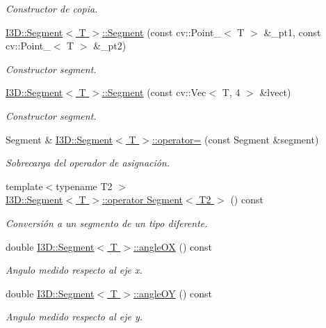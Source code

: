 \begin{DoxyCompactItemize}
\begin{DoxyCompactList}\small\item\em Constructor de copia. \end{DoxyCompactList}\item 
\hyperlink{group___geometric_entities_ga76e944eff092cf055965199957820f5b}{I3\+D\+::\+Segment$<$ T $>$\+::\+Segment} (const cv\+::\+Point\+\_\+$<$ T $>$ \&\+\_\+pt1, const cv\+::\+Point\+\_\+$<$ T $>$ \&\+\_\+pt2)
\begin{DoxyCompactList}\small\item\em Constructor segment. \end{DoxyCompactList}\item 
\hyperlink{group___geometric_entities_ga01623dcfd1be4e9472390b59e0ca3a58}{I3\+D\+::\+Segment$<$ T $>$\+::\+Segment} (const cv\+::\+Vec$<$ T, 4 $>$ \&lvect)
\begin{DoxyCompactList}\small\item\em Constructor segment. \end{DoxyCompactList}\item 
Segment \& \hyperlink{group___geometric_entities_gad1b2c0a4c4e1ea3c43ee24630eb26f1b}{I3\+D\+::\+Segment$<$ T $>$\+::operator=} (const Segment \&segment)
\begin{DoxyCompactList}\small\item\em Sobrecarga del operador de asignación. \end{DoxyCompactList}\item 
{\footnotesize template$<$typename T2 $>$ }\\\hyperlink{group___geometric_entities_ga363ef30b40d13ee361b9f0e32f135655}{I3\+D\+::\+Segment$<$ T $>$\+::operator Segment$<$ T2 $>$} () const 
\begin{DoxyCompactList}\small\item\em Conversión a un segmento de un tipo diferente. \end{DoxyCompactList}\item 
double \hyperlink{group___geometric_entities_ga911ebe69ce3cc5e6a486ef573d515866}{I3\+D\+::\+Segment$<$ T $>$\+::angle\+OX} () const 
\begin{DoxyCompactList}\small\item\em Angulo medido respecto al eje x. \end{DoxyCompactList}\item 
double \hyperlink{group___geometric_entities_ga324da1babfedb681fd7068fdc58d763b}{I3\+D\+::\+Segment$<$ T $>$\+::angle\+OY} () const 
\begin{DoxyCompactList}\small\item\em Angulo medido respecto al eje y. \end{DoxyCompactList}\item 

\end{DoxyCompactItemize}
